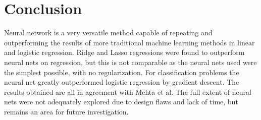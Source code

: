 \begin{minipage}{\columnwidth}
\section{Conclusion}\label{sec:Conclusion}

Neural network is a very versatile method capable of repeating and outperforming
the results of more traditional machine learning methods in linear and logistic
regression. Ridge and Lasso regressions were found to outperform neural nets on
regression, but this is not comparable as the neural nets used were the simplest
possible, with no regularization. For classification problems the neural net
greatly outperformed logistic regression by gradient descent. The results
obtained are all in agreement with Mehta et al. The full extent of neural nets
were not adequately explored due to design flaws and lack of time, but remains
an area for future investigation. 


\end{minipage}